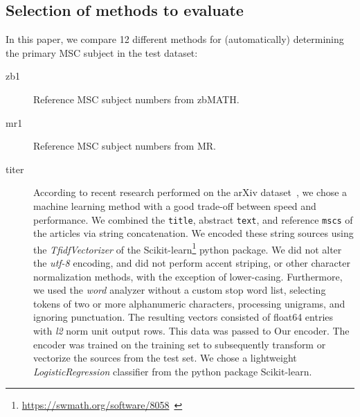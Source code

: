 \subsection{Selection of methods to evaluate}


In this paper, we compare 12 different methods for (automatically) determining the primary MSC subject in the test dataset:

\begin{description}
    \item[zb1] Reference MSC subject numbers from zbMATH.
  \item[mr1] Reference MSC subject numbers from MR.
  \item[titer]
  According to recent research performed on the arXiv dataset~\cite{Scharpf2020}, we chose a machine learning method with a good trade-off between speed and performance.
  We combined the \texttt{title}, abstract \texttt{text}, and reference \texttt{mscs} of the articles via string concatenation.
  We encoded these string sources using the \emph{TfidfVectorizer} of the Scikit-learn\footnote{\url{https://swmath.org/software/8058}~\cite{swSciKit}} python package.
  We did not alter the \emph{utf-8} encoding, and did not perform accent striping, or other character normalization methods, with the exception of lower-casing.
  Furthermore, we used the \emph{word} analyzer without a custom stop word list, selecting tokens of two or more alphanumeric characters, processing unigrams, and ignoring punctuation.
  The resulting vectors consisted of float64 entries with \emph{l2} norm unit output rows.
  This data was passed to Our encoder.
  The encoder was trained on the training set to subsequently transform or vectorize the sources from the test set.
  We chose a lightweight \emph{LogisticRegression} classifier from the python package Scikit-learn.

\end{description}
